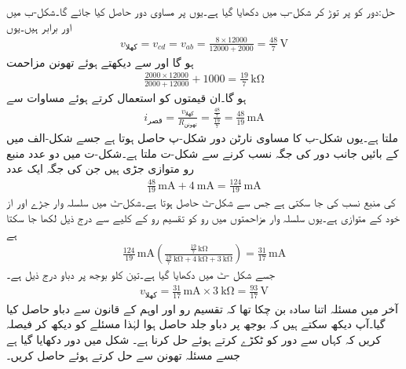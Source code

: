 حل:دور کو  پر توڑ  کر شکل-ب میں دکھایا گیا ہے۔یوں   پر مساوی دور حاصل کیا جائے گا۔شکل-ب میں  اور  برابر ہیں۔یوں
\begin{align*}
v_{\text{کھلا}} = v_{cd}= v_{ab} =\frac{8\times 12000}{12000+2000}=\frac{48}{7} \, \si{\volt}
\end{align*}
ہو گا اور   سے دیکھتے ہوئے تھونن مزاحمت
\begin{align*}
\frac{2000\times 12000}{2000+12000}+1000=\frac{19}{7}\, \si{\kilo\ohm}
\end{align*}
ہو گا۔ان قیمتوں کو استعمال کرتے ہوئے مساوات   سے
\begin{align*}
i_{\text{قصر}} =\frac{v_{\text{کھلا}}}{R_{\text{تھونن}}} =\frac{\frac{48}{7}}{\frac{19}{7}}=\frac{48}{19}\, \si{\milli\ampere}
\end{align*}
ملتا ہے۔یوں شکل-ب کا مساوی نارٹن دور شکل-پ حاصل ہوتا ہے جسے شکل-الف میں  کے بائیں جانب دور کی جگہ نسب کرنے سے شکل-ت ملتا ہے۔شکل-ت میں دو عدد منبع رو متوازی جڑی ہیں جن کی جگہ ایک عدد
\begin{align*}
\frac{48}{19} \, \si{\milli\ampere}+\SI{4}{\milli\ampere}=\frac{124}{19} \, \si{\milli\ampere}
\end{align*}
  کی منبع نسب کی جا سکتی ہے  جس سے شکل-ٹ حاصل ہوتا ہے۔شکل-ٹ میں سلسلہ وار جڑے  اور  از خود  کے متوازی ہے۔یوں سلسلہ وار مزاحمتوں میں رو کو تقسیم رو کے کلیے سے درج ذیل لکھا جا سکتا ہے
\begin{align*}
\frac{124}{19}\,\si{\milli\ampere}\left(\frac{\frac{19}{7} \, \si{\kilo\ohm}}{\frac{19}{7} \, \si{\kilo\ohm}+\SI{4}{\kilo\ohm}+\SI{3}{\kilo\ohm}} \right)=\frac{31}{17} \, \si{\milli\ampere}
\end{align*}
جسے شکل -ٹ میں دکھایا گیا ہے۔تین کلو  بوجھ پر دباو درج ذیل ہے۔
\begin{align*}
v_{\text{کھلا}}=\frac{31}{17} \, \si{\milli\ampere} \times \SI{3}{\kilo\ohm}=\frac{93}{17} \, \si{\volt}
\end{align*}
آخر میں مسئلہ اتنا سادہ بن چکا تھا کہ تقسیم رو اور اوہم کے قانون سے دباو حاصل کیا گیا۔آپ دیکھ سکتے ہیں کہ بوجھ پر دباو  جلد حاصل ہوا لہٰذا مسئلے کو دیکھ کر فیصلہ کریں کہ کہاں سے دور کو ٹکڑے کرتے ہوئے حل کرنا ہے۔
شکل  میں دور دکھایا گیا ہے جسے  مسئلہ تھونن سے حل کرتے ہوئے  حاصل کریں۔
